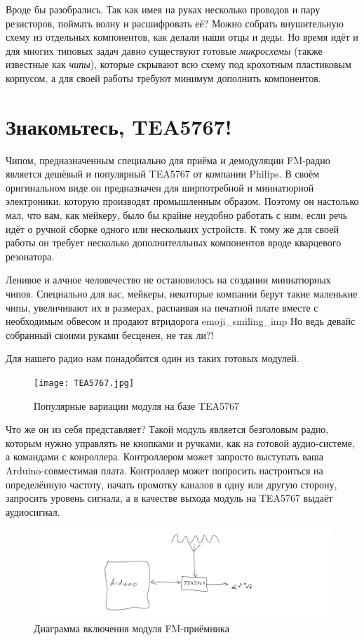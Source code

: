 Вроде бы разобрались. Так как имея на руках несколько проводов и пару резисторов, поймать волну и расшифровать её? Можно собрать внушительную схему из отдельных компонентов, как делали наши отцы и деды. Но время идёт и для многих типовых задач давно существуют готовые \emph{микросхемы} (также известные как \emph{чипы}), которые скрывают всю схему под крохотным пластиковым корпусом, а для своей работы требуют минимум дополнить компонентов.

\section{Знакомьтесь, TEA5767!}

Чипом, предназначенным специально для приёма и демодуляции FM-радио является дешёвый и популярный TEA5767 от компании Philips. В своём оригинальном виде он предназначен для ширпотребной и миниатюрной электроники, которую производят промышленным образом. Поэтому он настолько мал, что вам, как мейкеру, было бы крайне неудобно работать с ним, если речь идёт о ручной сборке одного или нескольких устройств. К тому же для своей работы он требует несколько дополнителльных компонентов вроде кварцевого резонатора.

Ленивое и алчное человечество не остановилось на создании миниатюрных чипов. Специально для вас, мейкеры, некоторые компании берут такие маленькие чипы, увеличивают их в размерах, распаивая на печатной плате вместе с необходимым обвесом и продают втридорога \textbar emoji\_smiling\_imp\textbar{} Но ведь девайс собранный своими руками бесценен, не так ли?!

Для нашего радио нам понадобится один из таких готовых модулей.

\begin{figure}
\centering
\texttt{[image: TEA5767.jpg]}
\caption{Популярные вариации модуля на базе TEA5767}
\end{figure}

Что же он из себя представляет? Такой модуль является безголовым радио, которым нужно управлять не кнопками и ручками, как на готовой аудио-системе, а командами с конроллера. Контроллером может запросто выступать ваша Arduino-совместимая плата. Контроллер может попросить настроиться на определённую частоту, начать промотку каналов в одну или другую сторону, запросить уровень сигнала, а в качестве выхода модуль на TEA5767 выдаёт аудиосигнал.

\begin{figure}
\centering
\includegraphics{sketches/fm-receiver-diagram}
\caption{Диаграмма включения модуля FM-приёмника}
\end{figure}

